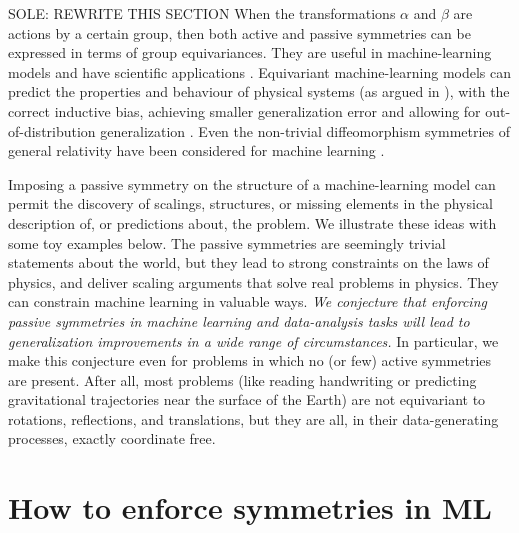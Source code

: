 \documentclass{article}
\theoremstyle{plain}
\theoremstyle{definition}
\theoremstyle{remark}
\newcommand{\bernhard}[1]{~B: \textcolor{red}{\textbf{#1}}}
\begin{document}


SOLE: REWRITE THIS SECTION
When the transformations $\alpha$ and $\beta$ are actions by a certain group, then both active and passive symmetries can be expressed in terms of group equivariances.
They are useful in machine-learning models \cite{cohen2016group, kondor2018convolution, thomas2018tensor, geiger2022e3nn, finzi2020generalizing, finzi2021practical} and have scientific applications \cite{batzner20223, musaelian2022learning, stark2022equibind, yu-physics, wang2022approximately}.
Equivariant machine-learning models can predict the properties and behaviour of physical systems (as argued in \cite{cheng2019covariance}), with the correct inductive bias, achieving smaller generalization error \cite{bietti2021sample, elesedy2021provably, elesedy2021kernel, mei2021learning} and allowing for out-of-distribution generalization \cite{villar2022dimensionless}. 
Even the non-trivial diffeomorphism symmetries of general relativity have been considered for machine learning \cite{weiler}.



Imposing a passive symmetry on the structure of a machine-learning model can permit the discovery of scalings, structures, or missing elements in the physical description of, or predictions about, the problem.
We illustrate these ideas with some toy examples below.
The passive symmetries are seemingly trivial statements about the world, but they lead to strong constraints on the laws of physics, and deliver scaling arguments that solve real problems in physics.
They can constrain machine learning in valuable ways.
\emph{We conjecture that enforcing passive symmetries in machine learning and data-analysis tasks will lead to generalization improvements in a wide range of circumstances.}
In particular, we make this conjecture even for problems in which no (or few) active symmetries are present.
After all, most problems (like reading handwriting or predicting gravitational trajectories near the surface of the Earth) are not equivariant to rotations, reflections, and translations, but they are all, in their data-generating processes, exactly coordinate free.

\section{How to enforce symmetries in ML}
\end{document}
